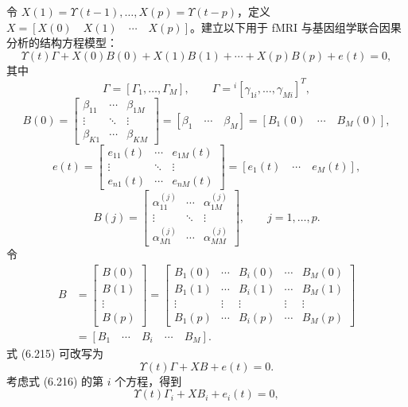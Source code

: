 令 $X(1)=\Upsilon(t-1),\ldots,X(p)=\Upsilon(t-p)$，定义 $X=[X(0)\quad X(1)\quad\cdots\quad X(p)]$。建立以下用于 fMRI 与基因组学联合因果分析的结构方程模型：
\begin{equation}
\Upsilon(t)\Gamma+X(0)B(0)+X(1)B(1)+\cdots+X(p)B(p)+e(t)=0,
\tag{6.215}
\end{equation}
其中
\[
\Gamma=[\Gamma_1,\ldots,\Gamma_M],\qquad\Gamma={}^i[\gamma_{1i},\ldots,\gamma_{Mi}]^T,
\]
\[
B(0)=\begin{bmatrix}\beta_{11}&\cdots&\beta_{1M}\\\vdots&\ddots&\vdots\\\beta_{K1}&\cdots&\beta_{KM}\end{bmatrix}
=[\beta_1\quad\cdots\quad\beta_M]=[B_1(0)\quad\cdots\quad B_M(0)],
\]
\[
e(t)=\begin{bmatrix}e_{11}(t)&\cdots&e_{1M}(t)\\\vdots&\ddots&\vdots\\e_{n1}(t)&\cdots&e_{nM}(t)\end{bmatrix}
=[e_1(t)\quad\cdots\quad e_M(t)],
\]
\[
B(j)=\begin{bmatrix}\alpha_{11}^{(j)}&\cdots&\alpha_{1M}^{(j)}\\\vdots&\ddots&\vdots\\\alpha_{M1}^{(j)}&\cdots&\alpha_{MM}^{(j)}\end{bmatrix},\qquad j=1,\ldots,p.
\]
令
\[
\begin{aligned}
B&=\begin{bmatrix}B(0)\\B(1)\\\vdots\\B(p)\end{bmatrix}
=\begin{bmatrix}
B_1(0)&\cdots&B_i(0)&\cdots&B_M(0)\\
B_1(1)&\cdots&B_i(1)&\cdots&B_M(1)\\
\vdots&\vdots&\vdots&\vdots&\vdots\\
B_1(p)&\cdots&B_i(p)&\cdots&B_M(p)
\end{bmatrix}\\
&=[B_1\quad\cdots\quad B_i\quad\cdots\quad B_M].
\end{aligned}
\]
式 (6.215) 可改写为
\begin{equation}
\Upsilon(t)\Gamma+XB+e(t)=0.
\tag{6.216}
\end{equation}
考虑式 (6.216) 的第 $i$ 个方程，得到
\begin{equation}
\Upsilon(t)\Gamma_i+XB_i+e_i(t)=0,
\tag{6.217}
\end{equation}
